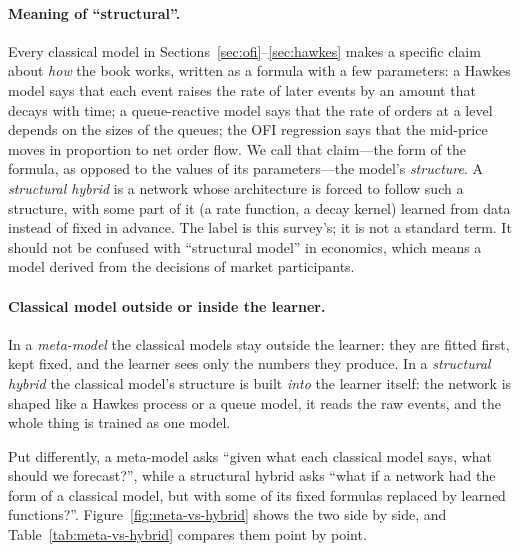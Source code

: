 \paragraph{Meaning of ``structural''.} Every classical model in Sections~\ref{sec:ofi}--\ref{sec:hawkes}
makes a specific claim about \emph{how} the book works, written as a formula with a few parameters: a Hawkes
model says that each event raises the rate of later events by an amount that decays with time; a
queue-reactive model says that the rate of orders at a level depends on the sizes of the queues; the OFI
regression says that the mid-price moves in proportion to net order flow. We call that claim---the form of
the formula, as opposed to the values of its parameters---the model's \emph{structure}. A \emph{structural
hybrid} is a network whose architecture is forced to follow such a structure, with some part of it (a rate
function, a decay kernel) learned from data instead of fixed in advance. The label is this survey's; it is
not a standard term. It should not be confused with ``structural model'' in economics, which means a model
derived from the decisions of market participants.

\paragraph{Classical model outside or inside the learner.} In a \emph{meta-model} the classical models stay outside the learner:
they are fitted first, kept fixed, and the learner sees only the numbers they produce. In a \emph{structural
hybrid} the classical model's structure is built \emph{into} the learner itself: the network is shaped like a
Hawkes process or a queue model, it reads the raw events, and the whole thing is trained as one model.

Put differently, a meta-model asks ``given what each classical model says, what should we forecast?'', while a
structural hybrid asks ``what if a network had the form of a classical model, but with some of its fixed
formulas replaced by learned functions?''. Figure~\ref{fig:meta-vs-hybrid} shows the two side by side, and
Table~\ref{tab:meta-vs-hybrid} compares them point by point.

